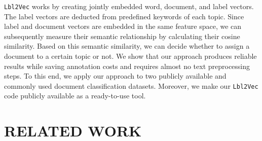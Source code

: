 \documentclass[a4paper,twoside]{article}
\begin{document}
\texttt{Lbl2Vec} works by creating jointly embedded word, document, and label vectors. The label vectors are deducted from predefined keywords of each topic. Since label and document vectors are embedded in the same feature space, we can subsequently measure their semantic relationship by calculating their cosine similarity. Based on this semantic similarity, we can decide whether to assign a document to a certain topic or not. \newline
We show that our approach produces reliable results while saving annotation costs and requires almost no text preprocessing steps. To this end, we apply our approach to two publicly available and commonly used document classification datasets. Moreover, we make our \texttt{Lbl2Vec} code publicly available as a ready-to-use tool.

\section{\uppercase{Related Work}}
\label{sec:related_work}
\end{document}
